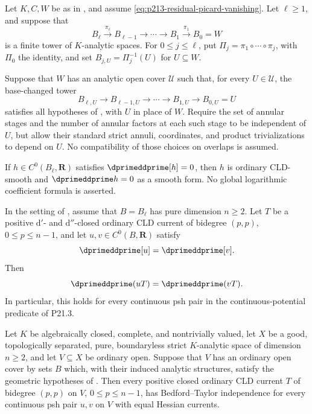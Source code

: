\begin{theorem}
\label{thm:p213-residual-picard-curve-local-interleaved-tower}
Let $K,C,W$ be as in
, and assume
\eqref{eq:p213-residual-picard-vanishing}.  Let $\ell\geq1$, and suppose
that
\[
 B_\ell\xrightarrow{\pi_\ell}B_{\ell-1}
 \longrightarrow\cdots\longrightarrow B_1
 \xrightarrow{\pi_1}B_0=W
\]
is a finite tower of $K$-analytic spaces.  For $0\leq j\leq\ell$, put
$\Pi_j=\pi_1\circ\cdots\circ\pi_j$, with $\Pi_0$ the identity, and set
$B_{j,U}=\Pi_j^{-1}(U)$ for $U\subseteq W$.

Suppose that $W$ has an analytic open cover $\mathcal U$ such that, for
every $U\in\mathcal U$, the base-changed tower
\[
 B_{\ell,U}\longrightarrow B_{\ell-1,U}
 \longrightarrow\cdots\longrightarrow B_{1,U}
 \longrightarrow B_{0,U}=U
\]
satisfies all hypotheses of
, with $U$ in
place of $W$.  Require the set of annular stages and the number of annular
factors at each such stage to be independent of $U$, but allow their
standard strict annuli, coordinates, and product trivializations to depend
on $U$.  No compatibility of those choices on overlaps is assumed.

If $h\in C^0(B_\ell,\mathbf R)$ satisfies
$\dprimeddprime[h]=0$, then $h$ is ordinary CLD-smooth and
$\dprimeddprime h=0$ as a smooth form.  No global logarithmic coefficient
formula is asserted.
\end{theorem}

\begin{corollary}
\label{cor:p213-residual-picard-curve-local-interleaved-tower-bt}
In the setting of
, assume that
$B=B_\ell$ has pure dimension $n\geq2$.  Let $T$ be a positive
$\mathrm d'$- and $\mathrm d''$-closed ordinary CLD current of bidegree
$(p,p)$, $0\leq p\leq n-1$, and let $u,v\in C^0(B,\mathbf R)$ satisfy
\[
                         \dprimeddprime[u]=\dprimeddprime[v].
\]
Then
\[
                         \dprimeddprime(uT)=\dprimeddprime(vT).
\]
In particular, this holds for every continuous psh pair in the
continuous-potential predicate of P21.3.
\end{corollary}

\begin{corollary}
\label{cor:p213-residual-picard-curve-local-interleaved-tower-cover-bt}
Let $K$ be algebraically closed, complete, and nontrivially valued, let
$X$ be a good, topologically separated, pure, boundaryless strict
$K$-analytic space of dimension $n\geq2$, and let $V\subseteq X$ be
ordinary open.  Suppose that $V$ has an ordinary open cover by sets $B$
which, with their induced analytic structures, satisfy the geometric
hypotheses of
.  Then
every positive closed ordinary CLD current $T$ of bidegree $(p,p)$ on $V$,
$0\leq p\leq n-1$, has Bedford--Taylor independence for every continuous
psh pair $u,v$ on $V$ with equal Hessian currents.
\end{corollary}

